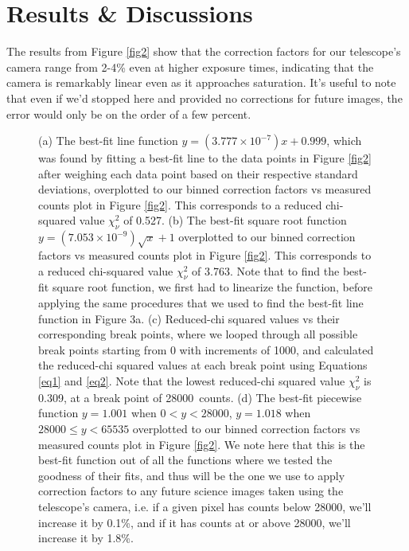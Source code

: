 \documentclass{article}
\newcommand{\rcs}{\chi^2_\nu}
\begin{document}
\section{Results \& Discussions}
The results from Figure \ref{fig2} show that the correction factors for our telescope's camera range from 2-4\% even at higher exposure times, indicating that the camera is remarkably linear even as it approaches saturation. It's useful to note that even if we'd stopped here and provided no corrections for future images, the error would only be on the order of a few percent.
\clearpage
\begin{figure}[!htb]
    \centering
    \hfill
    \hfill
    \hfill
    \hfill
    \caption{(a) The best-fit line function ${y=(3.777\times10^{-7})x+0.999}$, which was found by fitting a best-fit line to the data points in Figure \ref{fig2} after weighing each data point based on their respective standard deviations, overplotted to our binned correction factors vs measured counts plot in Figure \ref{fig2}. This corresponds to a reduced chi-squared value $\rcs$ of 0.527. (b) The best-fit square root function ${y=(7.053\times10^{-9})\sqrt{x}+1}$ overplotted to our binned correction factors vs measured counts plot in Figure \ref{fig2}. This corresponds to a reduced chi-squared value $\rcs$ of 3.763. Note that to find the best-fit square root function, we first had to linearize the function, before applying the same procedures that we used to find the best-fit line function in Figure 3a. (c) Reduced-chi squared values vs their corresponding break points, where we looped through all possible break points starting from 0 with increments of 1000, and calculated the reduced-chi squared values at each break point using Equations \ref{eq1} and \ref{eq2}. Note that the lowest reduced-chi squared value $\rcs$ is 0.309, at a break point of 28000~counts. (d) The best-fit piecewise function ${y=1.001}$ when ${0<y<28000}$, ${y=1.018}$ when ${28000\leq y<65535}$ overplotted to our binned correction factors vs measured counts plot in Figure \ref{fig2}. We note here that this is the best-fit function out of all the functions where we tested the goodness of their fits, and thus will be the one we use to apply correction factors to any future science images taken using the telescope's camera, i.e. if a given pixel has counts below 28000, we'll increase it by 0.1\%, and if it has counts at or above 28000, we'll increase it by 1.8\%.}
    \label{fig3}
\end{figure}
\clearpage
\end{document}
